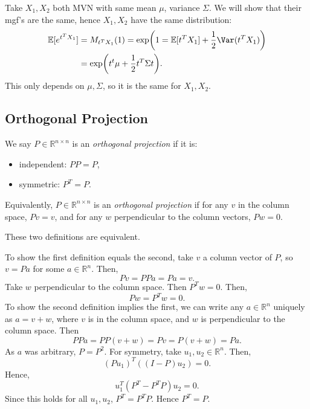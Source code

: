 \documentclass[12pt]{article}
\begin{document}
\begin{proofbox}
	Take $X_1, X_2$ both MVN with same mean $\mu$, variance $\Sigma$. We will show that their mgf's are the same, hence $X_1, X_2$ have the same distribution:
	\begin{align*}
		\mathbb{E}[e^{t^{T}X_1}] &= M_{t^{T}X_1}(1) = \exp \biggl( 1 = \mathbb{E}[t^{T}X_1] + \frac{1}{2} \Var(t^{T}X_1)\biggr) \\
					 &= \exp\biggl(t^{t}\mu + \frac{1}{2} t^{T}\Sigma t\biggr).
	\end{align*}
	This only depends on $\mu, \Sigma$, so it is the same for $X_1, X_2$.
\end{proofbox}

\subsection{Orthogonal Projection}
\label{sub:orthogonal_projection}

\begin{definition}
	We say $P \in \mathbb{R}^{n \times n}$ is an \emph{orthogonal projection}  if it is:
	\begin{itemize}
		\item independent: $PP = P$,
		\item symmetric: $P^{T} = P$.
	\end{itemize}
	Equivalently, $P \in \mathbb{R}^{n \times n}$ is an \emph{orthogonal projection} if for any $v$ in the column space, $Pv = v$, and for any $w$ perpendicular to the column vectors, $Pw = 0$.
\end{definition}

\begin{proposition}
	These two definitions are equivalent.
\end{proposition}

\begin{proofbox}
	To show the first definition equals the second, take $v$ a column vector of $P$, so $v = Pa$ for some $a \in \mathbb{R}^{n}$. Then,
	\[
	Pv = PPa = Pa = v.
	\]
	Take $w$ perpendicular to the column space. Then $P^{T}w = 0$. Then,
	\[
	Pw = P^{T}w = 0.
	\]
	To show the second definition implies the first, we can write any $a \in \mathbb{R}^{n}$ uniquely as $a = v + w$, where $v$ is in the column space, and $w$ is perpendicular to the column space. Then
	\[
	PPa = PP(v+w) = Pv = P(v+w) = Pa.
	\]
	As $a$ was arbitrary, $P = P^2$. For symmetry, take $u_1, u_2 \in \mathbb{R}^{n}$. Then,
	\[
		(Pu_1)^{T}((I-P)u_2) = 0.
	\]
	Hence,
	\[
	u_1^{T}(P^{T} - P^{T}P)u_2 = 0.
	\]
	Since this holds for all $u_1, u_2$, $P^{T} = P^{T}P$. Hence $P^{T} = P$.
\end{proofbox}
\end{document}

